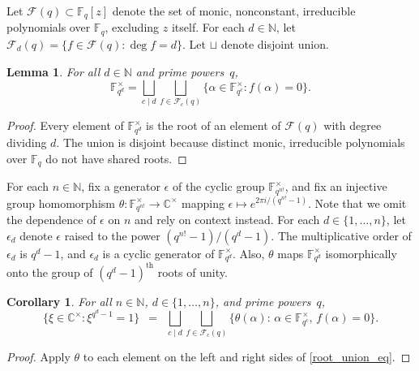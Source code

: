 \documentclass[10pt]{article}
\newtheorem{lemma}[theorem]{Lemma}
\newtheorem{corollary}[theorem]{Corollary}
\theoremstyle{definition}
\newcommand{\Cbb}{\mathbb{C}}
\newcommand{\F}{\mathbb{F}}
\newcommand{\CF}{\mathcal{F}}
\newcommand{\N}{\mathbb{N}}
\newcommand{\eps}{\epsilon}
\newcommand{\te}{\theta}
\begin{document}
Let \(\CF (q) \subset \F_q[z] \) denote the set of monic, nonconstant, irreducible polynomials over \(\F_q\), excluding \(z\) itself.
For each \(d \in \N\), let \(\CF_d (q) = \{f \in \CF (q) : \deg f = d\}\).
Let \(\sqcup\) denote disjoint union.
\begin{lemma}
\label{root_union}
For all \(d \in \N\) and prime powers~\(q\),
\begin{equation}
\label{root_union_eq}
\F_{q^d}^\times
=
\bigsqcup_{c \mid d}
\bigsqcup_{f \in \CF_c (q)}
\{\alpha \in \F_{q^c}^\times : f(\alpha) = 0\}.
\end{equation}
\end{lemma}
\begin{proof}
Every element of \(\F_{q^d}^\times\) is the root of an element of \(\CF (q)\) with degree dividing \(d\).
The union is disjoint because distinct monic, irreducible polynomials over \(\F_q\) do not have shared roots.
\end{proof}

For each \(n \in \N\), fix a generator \(\eps\) of the cyclic group \(\F_{q^{n!}}^\times\), and fix an injective group homomorphism \(\te : \F_{q^{n!}}^\times \to \Cbb^\times\) mapping \(\eps \mapsto e^{2 \pi i / (q^{n!}-1)}\).
Note that we omit the dependence of \(\eps\) on \(n\)
and rely on context instead.
For each \(d \in \{1,\ldots,n\}\), let \(\eps_d\) denote \(\eps\) raised to the power \( (q^{n!}-1) / (q^d-1)\).
The multiplicative order of \(\eps_d\) is \(q^d-1\), and \(\eps_d\) is a cyclic generator of \(\F_{q^d}^\times\).
Also, \(\te\) maps \(\F_{q^d}^\times\) isomorphically onto the group of \((q^d-1)^\text{th}\) roots of unity.

\begin{corollary}
\label{theta_of_root_union}
For all \(n \in \N\), \(d \in \{1,\ldots,n\}\), and prime powers~\(q\),
\begin{equation}
\label{theta_of_root_union_eq}
\{\xi \in \Cbb^\times : \xi^{q^d-1} = 1\}
\,\,\,
=
\,\,\,
\bigsqcup_{c \mid d}
\bigsqcup_{f \in \CF_c (q)}
\{\te(\alpha) : \, \alpha \in \F_{q^c}^\times, \, f(\alpha) = 0\}.
\end{equation}
\end{corollary}

\begin{proof}
Apply \(\te\) to each element on the left and right sides of \eqref{root_union_eq}.
\end{proof}
\end{document}
